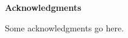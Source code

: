%
%
\begin{center}

\bigskip

\begin{Large}
\textbf{Acknowledgments}
\end{Large}

\bigskip

\end{center}

Some acknowledgments go here.

